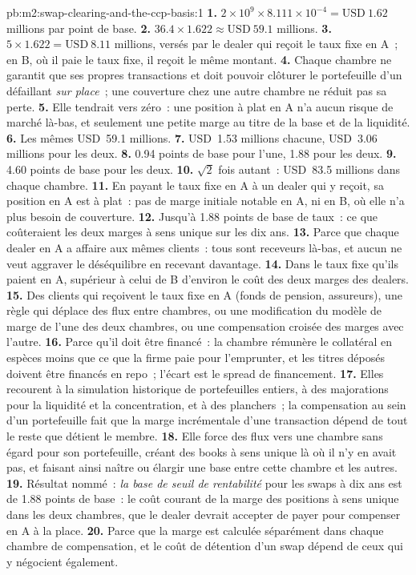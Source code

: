 \begin{solution}{pb:m2:swap-clearing-and-the-ccp-basis:1}
\textbf{1.} $2 \times 10^9 \times 8.111 \times 10^{-4} = \text{USD}~1.62$ millions par point de base.
\textbf{2.} $36.4 \times 1.622 \approx \text{USD}~59.1$ millions.
\textbf{3.} $5 \times 1.622 = \text{USD}~8.11$ millions, versés par le dealer qui reçoit
le taux fixe en A~; en B, où il paie le taux fixe, il reçoit le même montant.
\textbf{4.} Chaque chambre ne garantit que ses propres transactions et doit pouvoir clôturer
le portefeuille d'un défaillant \emph{sur place}~; une couverture chez une autre chambre ne
réduit pas sa perte.
\textbf{5.} Elle tendrait vers zéro~: une position à plat en A n'a aucun risque de marché
là-bas, et seulement une petite marge au titre de la base et de la liquidité.
\textbf{6.} Les mêmes USD~59.1 millions.
\textbf{7.} USD~1.53 millions chacune, USD~3.06 millions pour les deux.
\textbf{8.} 0.94 points de base pour l'une, 1.88 pour les deux.
\textbf{9.} 4.60 points de base pour les deux.
\textbf{10.} $\sqrt 2$ fois autant~: USD~83.5 millions dans chaque chambre.
\textbf{11.} En payant le taux fixe en A à un dealer qui y reçoit, sa position en
A est à plat~: pas de marge initiale notable en A, ni en B, où elle n'a plus
besoin de couverture.
\textbf{12.} Jusqu'à 1.88 points de base de taux~: ce que coûteraient les deux marges
à sens unique sur les dix ans.
\textbf{13.} Parce que chaque dealer en A a affaire aux mêmes clients~: tous sont receveurs
là-bas, et aucun ne veut aggraver le déséquilibre en recevant davantage.
\textbf{14.} Dans le taux fixe qu'ils paient en A, supérieur à celui de B d'environ le coût
des deux marges des dealers.
\textbf{15.} Des clients qui reçoivent le taux fixe en A (fonds de pension, assureurs), une règle
qui déplace des flux entre chambres, ou une modification du modèle de marge de l'une des deux
chambres, ou une compensation croisée des marges avec l'autre.
\textbf{16.} Parce qu'il doit être financé~: la chambre rémunère le collatéral en espèces moins
que ce que la firme paie pour l'emprunter, et les titres déposés doivent être financés en
repo~; l'écart est le spread de financement.
\textbf{17.} Elles recourent à la simulation historique de portefeuilles entiers, à des majorations pour
la liquidité et la concentration, et à des planchers~; la compensation au sein d'un portefeuille fait
que la marge incrémentale d'une transaction dépend de tout le reste que détient le membre.
\textbf{18.} Elle force des flux vers une chambre sans égard pour son portefeuille, créant
des books à sens unique là où il n'y en avait pas, et faisant ainsi naître ou élargir une base
entre cette chambre et les autres.
\textbf{19.} Résultat nommé~: \emph{la base de seuil de rentabilité} pour les swaps à dix ans est de 1.88
points de base~: le coût courant de la marge des positions à sens unique dans les deux chambres, que
le dealer devrait accepter de payer pour compenser en A à la place.
\textbf{20.} Parce que la marge est calculée séparément dans chaque chambre de compensation, et
le coût de détention d'un swap dépend de ceux qui y négocient également.
\end{solution}

